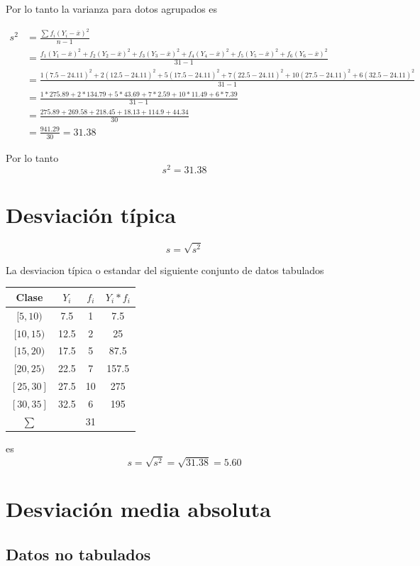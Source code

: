 \documentclass[10pt,]{krantz}
\theoremstyle{definition}
\theoremstyle{definition}
\theoremstyle{definition}
\theoremstyle{definition}
\theoremstyle{remark}
\begin{document}
Por lo tanto la varianza para dotos agrupados es

\[
\begin{aligned}
s^2&=\frac{\sum f_i\left(Y_i-\overline{x}\right )^2}{n-1}\\
&=\frac{f_1\left(Y_1-\overline{x}\right )^2+f_2\left(Y_2-\overline{x}\right )^2+f_3\left(Y_3-\overline{x}\right )^2+f_4\left(Y_4-\overline{x}\right )^2+f_5\left(Y_5-\overline{x}\right )^2+f_6\left(Y_6-\overline{x}\right )^2}{31-1}\\
&=\frac{1\left(7.5-24.11\right )^2+2\left(12.5-24.11\right )^2+5\left(17.5-24.11\right )^2+7\left(22.5-24.11\right )^2+10\left(27.5-24.11\right )^2+6\left(32.5-24.11\right )^2}{31-1}
\\
&=\frac{1*275.89+2*134.79+5*43.69+7*2.59+10*11.49+6*7.39}{31-1}
\\
&=\frac{275.89+269.58+218.45+18.13+114.9+44.34}{30}\\
&=\frac{941.29}{30}=31.38
\end{aligned}
\]

Por lo tanto \[s^2=  31.38\]

\hypertarget{desviaciuxf3n-tuxedpica}{%
\section{Desviación típica}\label{desviaciuxf3n-tuxedpica}}

\[s=\sqrt{s^2}\]

La desviacion típica o estandar del siguiente conjunto de datos tabulados

\begin{longtable}[]{@{}cccc@{}}
\toprule
Clase & \(Y_i\) & \(f_i\) & \(Y_i*f_i\)\tabularnewline
\midrule
\endhead
\([5,10)\) & 7.5 & 1 & 7.5\tabularnewline
\([10,15)\) & 12.5 & 2 & 25\tabularnewline
\([15,20)\) & 17.5 & 5 & 87.5\tabularnewline
\([20,25)\) & 22.5 & 7 & 157.5\tabularnewline
\([25,30]\) & 27.5 & 10 & 275\tabularnewline
\([30,35]\) & 32.5 & 6 & 195\tabularnewline
\(\sum\) & & 31 &\tabularnewline
\bottomrule
\end{longtable}

es \[s=\sqrt{s^2}=\sqrt{31.38}=5.60\]

\hypertarget{desviaciuxf3n-media-absoluta}{%
\section{Desviación media absoluta}\label{desviaciuxf3n-media-absoluta}}

\hypertarget{datos-no-tabulados-1}{%
\subsection{Datos no tabulados}\label{datos-no-tabulados-1}}
\end{document}
